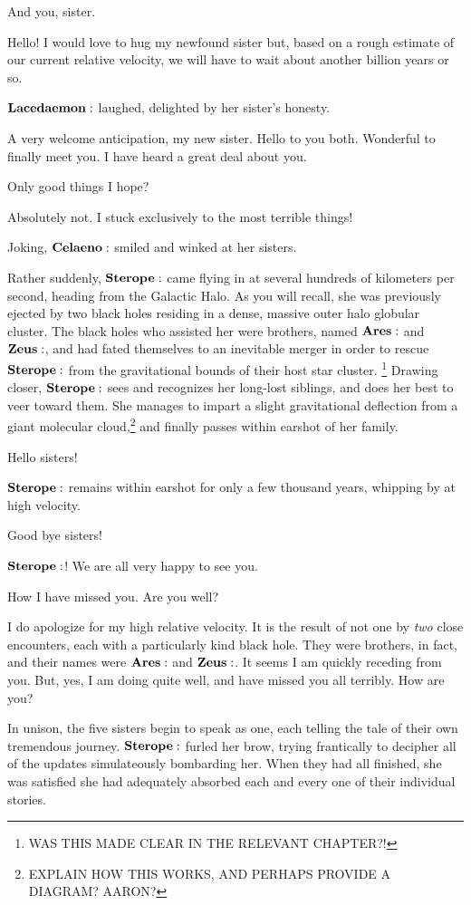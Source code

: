 \documentclass[main.tex]{subfiles}
\begin{document}
\Merope And you, sister.

\Maia Hello!  I would love to hug my newfound sister but, based on a rough estimate of our current relative velocity, we will have to wait about another billion years or so.

$\Lacedaemon$ laughed, delighted by her sister's honesty.

\Lacedaemon A very welcome anticipation, my new sister.  Hello to you both.  Wonderful to finally meet you.  I have heard a great deal about you.

\Merope Only good things I hope?

\Celaeno Absolutely not.  I stuck exclusively to the most terrible things!

Joking, $\Celaeno$ smiled and winked at her sisters.

Rather suddenly, $\Sterope$ came flying in at several hundreds of kilometers per second, heading from the Galactic Halo.  As you will recall, she was previously ejected by two black holes residing in a dense, massive outer halo globular cluster.  The black holes who assisted her were brothers, named $\Ares$ and $\Zeus$, and had fated themselves to an inevitable merger in order to rescue $\Sterope$ from the gravitational bounds of their host star cluster. \footnote{WAS THIS MADE CLEAR IN THE RELEVANT CHAPTER?!} Drawing closer, $\Sterope$ sees and recognizes her long-lost siblings, and does her best to veer toward them.  She manages to impart a slight gravitational deflection from a giant molecular cloud,\footnote{EXPLAIN HOW THIS WORKS, AND PERHAPS PROVIDE A DIAGRAM?  AARON?} and finally passes within earshot of her family.  

\Sterope Hello sisters!

$\Sterope$ remains within earshot for only a few thousand years, whipping by at high velocity.

\Sterope Good bye sisters!

\Maia $\Sterope$!  We are all very happy to see you.

\Celaeno How I have missed you.  Are you well?

\Sterope I do apologize for my high relative velocity.  It is the result of not one by \textit{two} close encounters, each with a particularly kind black hole.  They were brothers, in fact, and their names were $\Ares$ and $\Zeus$.  It seems I am quickly receding from you.  But, yes, I am doing quite well, and have missed you all terribly.  How are you?

In unison, the five sisters begin to speak as one, each telling the tale of their own tremendous journey.  $\Sterope$ furled her brow, trying frantically to decipher all of the updates simulateously bombarding her.  When they had all finished, she was satisfied she had adequately absorbed each and every one of their individual stories.
\end{document}
